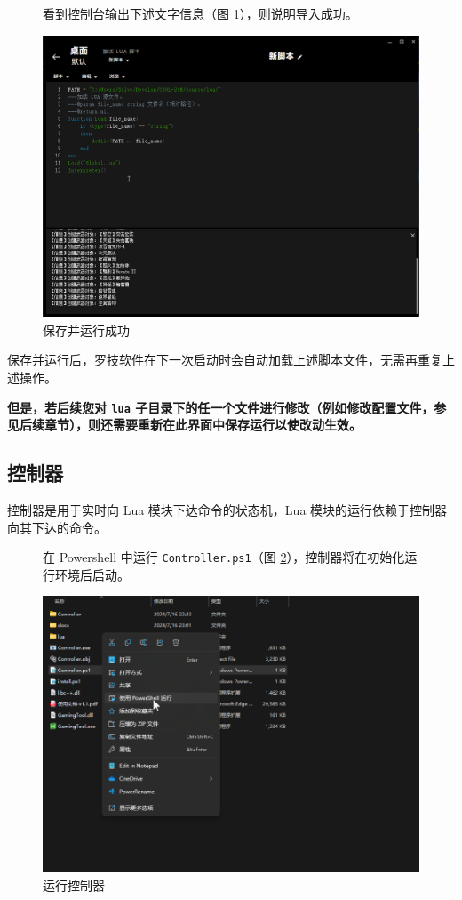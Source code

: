 \begin{figure}[H]
    \Centering
    \parbox[l]{\textwidth}{看到控制台输出下述文字信息（图 \ref{ch0fig-success}），则说明导入成功。}
    \includegraphics[width=\textwidth]{docs/assets/intro/success.png}
    \caption{保存并运行成功}
    \label{ch0fig-success}
\end{figure}

保存并运行后，罗技软件在下一次启动时会自动加载上述脚本文件，无需再重复上述操作。

\textbf{\color{red}但是，若后续您对 \lstinline{lua} 子目录下的任一个文件进行修改（例如修改配置文件，参见后续章节），则还需要重新在此界面中保存运行以使改动生效。}

\subsection{控制器}

控制器是用于实时向 Lua 模块下达命令的状态机，Lua 模块的运行依赖于控制器向其下达的命令。

\begin{figure}[H]
    \Centering
    \parbox[l]{\textwidth}{在 Powershell 中运行 \lstinline{Controller.ps1}（图 \ref{ch0fig-run-controller}），控制器将在初始化运行环境后启动。}
    \includegraphics[width=\textwidth]{docs/assets/intro/run_controller.png}
    \caption{运行控制器}
    \label{ch0fig-run-controller}
\end{figure}

